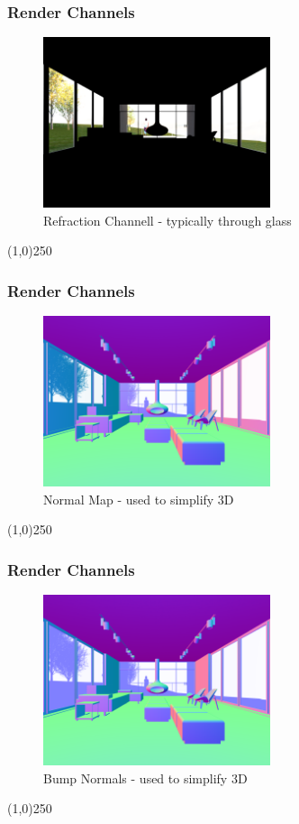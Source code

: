 \begin{frame}
\frametitle{Render Channels}
\begin{figure}
	\centering
	\includegraphics[height=5cm]{./img/Rendering/SittingRoomFinalRefraction.png}
	\caption[Refraction Channell - typically through glass]{Refraction Channell - typically through glass}
	\label{fig:sittingroomfinalRefraction}
\end{figure}
\end{frame}
\begin{center}\line(1,0){250}\end{center}

\begin{frame}
\frametitle{Render Channels}
\begin{figure}
	\centering
	\includegraphics[height=5cm]{./img/Rendering/SittingRoomFinalNormals.png}
	\caption[Normal Map - used to simplify 3D]{Normal Map - used to simplify 3D}
	\label{fig:sittingroomfinalNormal}
\end{figure}
\end{frame}
\begin{center}\line(1,0){250}\end{center}

\begin{frame}
\frametitle{Render Channels}
\begin{figure}
	\centering
	\includegraphics[height=5cm]{./img/Rendering/SittingRoomFinalBump_Normal.png}
	\caption[Bump Normals - used to simplify 3D]{Bump Normals - used to simplify 3D}
	\label{fig:sittingroomfinalBumpNormal}
\end{figure}
\end{frame}
\begin{center}\line(1,0){250}\end{center}

